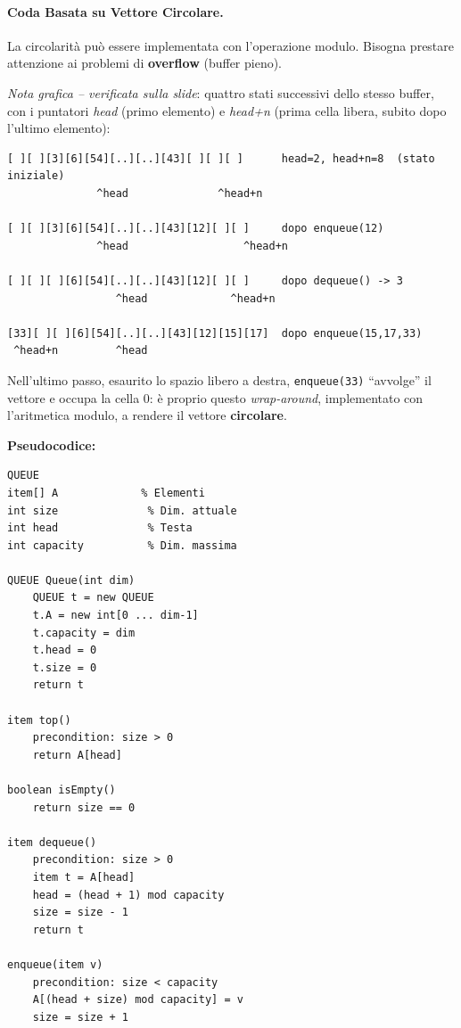 \documentclass[12pt, a4paper]{article}
\begin{document}
\paragraph{Coda Basata su Vettore Circolare.}
La circolarità può essere implementata con l'operazione modulo. Bisogna prestare attenzione ai problemi di \textbf{overflow} (buffer pieno).

\textit{Nota grafica -- verificata sulla slide}: quattro stati successivi dello stesso buffer, con i puntatori \textit{head} (primo elemento) e \textit{head+n} (prima cella libera, subito dopo l'ultimo elemento):
\begin{verbatim}
[ ][ ][3][6][54][..][..][43][ ][ ][ ]      head=2, head+n=8  (stato iniziale)
              ^head              ^head+n

[ ][ ][3][6][54][..][..][43][12][ ][ ]     dopo enqueue(12)
              ^head                  ^head+n

[ ][ ][ ][6][54][..][..][43][12][ ][ ]     dopo dequeue() -> 3
                 ^head             ^head+n

[33][ ][ ][6][54][..][..][43][12][15][17]  dopo enqueue(15,17,33)
 ^head+n         ^head
\end{verbatim}
Nell'ultimo passo, esaurito lo spazio libero a destra, \texttt{enqueue(33)} ``avvolge'' il vettore e occupa la cella $0$: è proprio questo \textit{wrap-around}, implementato con l'aritmetica modulo, a rendere il vettore \textbf{circolare}.

\textbf{Pseudocodice:}
\begin{verbatim}
QUEUE
item[] A             % Elementi
int size              % Dim. attuale
int head              % Testa
int capacity          % Dim. massima

QUEUE Queue(int dim)
    QUEUE t = new QUEUE
    t.A = new int[0 ... dim-1]
    t.capacity = dim
    t.head = 0
    t.size = 0
    return t

item top()
    precondition: size > 0
    return A[head]

boolean isEmpty()
    return size == 0

item dequeue()
    precondition: size > 0
    item t = A[head]
    head = (head + 1) mod capacity
    size = size - 1
    return t

enqueue(item v)
    precondition: size < capacity
    A[(head + size) mod capacity] = v
    size = size + 1
\end{verbatim}
\end{document}
